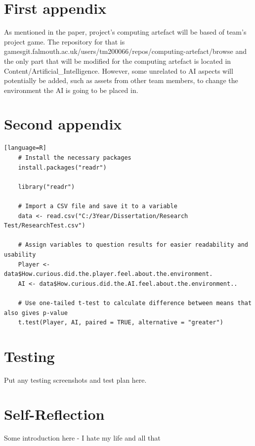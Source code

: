 \documentclass[journal]{IEEEtran}
\begin{document}





\appendices
\section{First appendix}
\label{appendix:a}
As mentioned in the paper, project's computing artefact will be based of team's project game. The repository for that is gamesgit.falmouth.ac.uk/users/tm200066/repos/computing-artefact/browse and the only part that will be modified for the computing artefact is located in Content/Artificial\_Intelligence. However, some unrelated to AI aspects will potentially be added, such as assets from other team members, to change the environment the AI is going to be placed in.

\newpage

\section{Second appendix}
\label{appendix:b}
\begin{lstlisting}[frame=single, breaklines=true][language=R]
	# Install the necessary packages
	install.packages("readr")

	library("readr")

	# Import a CSV file and save it to a variable
	data <- read.csv("C:/3Year/Dissertation/Research Test/ResearchTest.csv")

	# Assign variables to question results for easier readability and usability
	Player <- data$How.curious.did.the.player.feel.about.the.environment.
	AI <- data$How.curious.did.the.AI.feel.about.the.environment..

	# Use one-tailed t-test to calculate difference between means that also gives p-value
	t.test(Player, AI, paired = TRUE, alternative = "greater")
\end{lstlisting}

\section{Testing}
Put any testing screenshots and test plan here.

\section{Self-Reflection}
Some introduction here - I hate my life and all that
\end{document}
